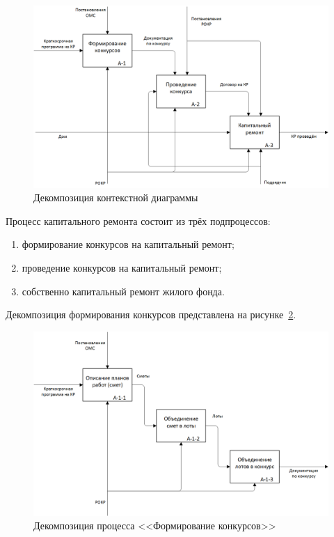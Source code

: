 \begin{figure}[h!]
	\begin{center}
		\begin{minipage}[h]{\linewidth}
			\centering
			\includegraphics[width=\linewidth]{images/source-A0.png}
			\caption{Декомпозиция контекстной диаграммы}
			\label{img:source-A0}
		\end{minipage}
		\hfill
	\end{center}
\end{figure}

Процесс капитального ремонта состоит из трёх подпроцессов:

\begin{enumerate}
	\item формирование конкурсов на капитальный ремонт;
	\item проведение конкурсов на капитальный ремонт;
	\item собственно капитальный ремонт жилого фонда.
\end{enumerate}

Декомпозиция формирования конкурсов представлена на рисунке~\ref{img:source-A1}.

\begin{figure}[h!]
	\begin{center}
		\begin{minipage}[h]{\linewidth}
			\centering
			\includegraphics[width=\linewidth]{images/source-A1.png}
			\caption{Декомпозиция процесса <<Формирование конкурсов>>}
			\label{img:source-A1}
		\end{minipage}
		\hfill
	\end{center}
\end{figure}

